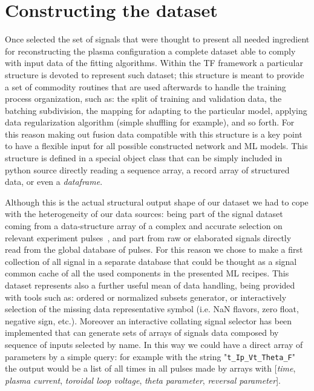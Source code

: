 \section{Constructing the dataset} %

Once selected the set of signals that were thought to present all needed ingredient for reconstructing the plasma configuration a complete dataset able to comply with \Tensorflow input data of the fitting algorithms. Within the \acs{TF} framework a particular structure is devoted to represent such dataset; this structure is meant to provide a set of commodity routines that are used afterwards to handle the training process organization, such as: the split of training and validation data, the batching subdivision, the mapping for adapting to the particular model, applying data regularization algorithm (simple shuffling for example), and so forth.
For this reason making out fusion data compatible with this structure is a key point to have a flexible input for all possible constructed network and ML models. 
This structure is defined in a special \TF object class that can be simply included in python source directly reading a sequence array, a record array of structured data, or even a \Pandas \textit{dataframe}.

Although this is the actual structural output shape of our dataset we had to cope with the heterogeneity of our data sources: being part of the signal dataset coming from a \IDL data-structure array of a complex and accurate selection on relevant experiment pulses~\cite{Gobbin_QSH}, and part from raw or elaborated signals directly read from the global \MDSplus database of pulses.
For this reason we chose to make a first collection of all signal in a separate database that could be thought as a signal common cache of all the used components in the presented ML recipes.
This dataset represents also a further useful mean of data handling, being provided with tools such as: ordered or normalized subsets generator, or interactively selection of the missing data representative symbol (i.e. NaN flavors, zero float, negative sign, etc.).
Moreover an interactive collating signal selector has been implemented that can generate sets of arrays of signals data composed by sequence of inputs selected by name. In this way we could have a direct array of parameters by a simple query: for example with the string "\texttt{t\_Ip\_Vt\_Theta\_F}" the output would be a list of all times in all pulses made by arrays with [\textit{time}, \textit{plasma current}, \textit{toroidal loop voltage}, \textit{theta parameter}, \textit{reversal parameter}].

